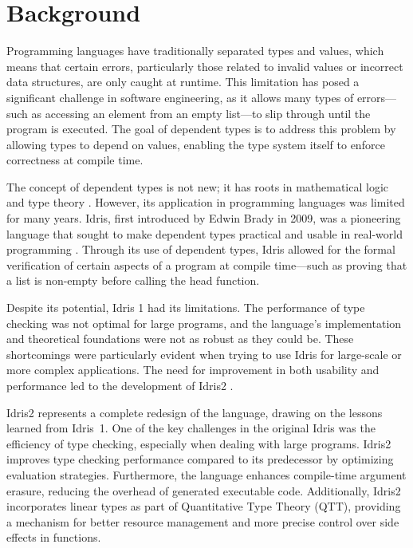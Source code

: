 \documentclass[]{rptuseminar}
\begin{document}
\section{Background}  
\label{sec:background}  

Programming languages have traditionally separated types and values, which means that certain errors, particularly those related to invalid values or incorrect data structures, are only caught at runtime. This limitation has posed a significant challenge in software engineering, as it allows many types of errors—such as accessing an element from an empty list—to slip through until the program is executed. The goal of dependent types is to address this problem by allowing types to depend on values, enabling the type system itself to enforce correctness at compile time.

The concept of dependent types is not new; it has roots in mathematical logic and type theory \cite{martin1984intuitionistic}. However, its application in programming languages was limited for many years. Idris, first introduced by Edwin Brady in 2009, was a pioneering language that sought to make dependent types practical and usable in real-world programming \cite{brady2013idris}. Through its use of dependent types, Idris allowed for the formal verification of certain aspects of a program at compile time—such as proving that a list is non-empty before calling the head function.

Despite its potential, Idris 1 had its limitations. The performance of type checking was not optimal for large programs, and the language's implementation and theoretical foundations were not as robust as they could be. These shortcomings were particularly evident when trying to use Idris for large-scale or more complex applications. The need for improvement in both usability and performance led to the development of Idris2 \cite{brady2021idris}.

Idris2 represents a complete redesign of the language, drawing on the lessons learned from Idris~1. One of the key challenges in the original Idris was the efficiency of type checking, especially when dealing with large programs. Idris2 improves type checking performance compared to its predecessor by optimizing evaluation strategies. Furthermore, the language enhances compile-time argument erasure, reducing the overhead of generated executable code. Additionally, Idris2 incorporates linear types as part of Quantitative Type Theory (QTT), providing a mechanism for better resource management and more precise control over side effects in functions\cite{brady2021idris}.
  
\end{document}
